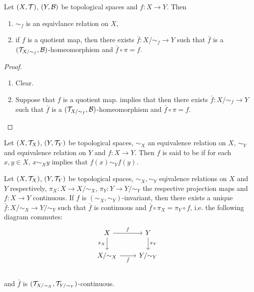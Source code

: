 \documentclass{book}
\begin{document}
	\begin{ex} 
		Let $(X, \mathcal{T})$, $(Y, \mathcal{B})$ be topological spaces and $f:X \rightarrow Y$. Then 
		\begin{enumerate}
			\item $\sim_f$ is an equivlance relation on $X$,
			\item if $f$ is a quotient map, then there exists $\bar{f}: X/{\sim_f} \rightarrow Y$ such that $\bar{f}$ is a  $(\mathcal{T}_{X/{\sim_f}}, \mathcal{B})$-homeomorphism and $\bar{f} \circ \pi = f$. 
		\end{enumerate}
	\end{ex}

	\begin{proof} \
		\begin{enumerate}
			\item Clear.
			\item Suppose that $f$ is a quotient map.  implies that then there exists $\bar{f}: X/{\sim_f} \rightarrow Y$ such that $\bar{f}$ is a  $(\mathcal{T}_{X/{\sim_f}}, \mathcal{B})$-homeomorphism and $\bar{f} \circ \pi = f$. 
		\end{enumerate}
	\end{proof}
	
	\begin{defn} 
		Let $(X, \mathcal{T}_X)$, $(Y, \mathcal{T}_Y)$ be topological spaces, $\sim_X$ an equivalence relation on $X$, $\sim_Y$ and equivalence relation on $Y$ and $f : X \rightarrow Y $. Then $f$ is said to be  if for each $x, y \in X$, $x \sim_X y$ implies that $f(x) \sim_Y f(y)$.
	\end{defn}
	
	\begin{ex} 
	Let $(X, \mathcal{T}_X)$, $(Y, \mathcal{T}_Y)$ be topological spaces, $\sim_X, \sim_Y$ eqivalence relations on $X$ and $Y$ respectively, $\pi_X:X \rightarrow X/\sim_X$, $\pi_Y:Y \rightarrow Y/\sim_Y$ the respective projection maps and $f:X \rightarrow Y$ continuous. If $f$ is $(\sim_X, \sim_Y)$-invariant, then there exists a unique $\bar{f}:X / {\sim}_X \rightarrow Y/ {\sim_Y}$ such that $\bar{f}$ is continuous and $\bar{f} \circ \pi_X = \pi_Y \circ f$, i.e. the following diagram commutes:
	\[ 
	\begin{tikzcd}
		X  \arrow[r, "f"]  \arrow[d, "\pi_X"']  & Y   \arrow[d, "\pi_Y"]\\
		X/ {\sim_X} \arrow[r, "\bar{f}"'] &  Y / {\sim_Y} \\
	\end{tikzcd}
	\]
	and $\bar{f}$ is $(\mathcal{T}_{X/ \sim_X}, \mathcal{T}_{Y/ \sim_Y})$-continuous.
	\end{ex}
	
\end{document}

